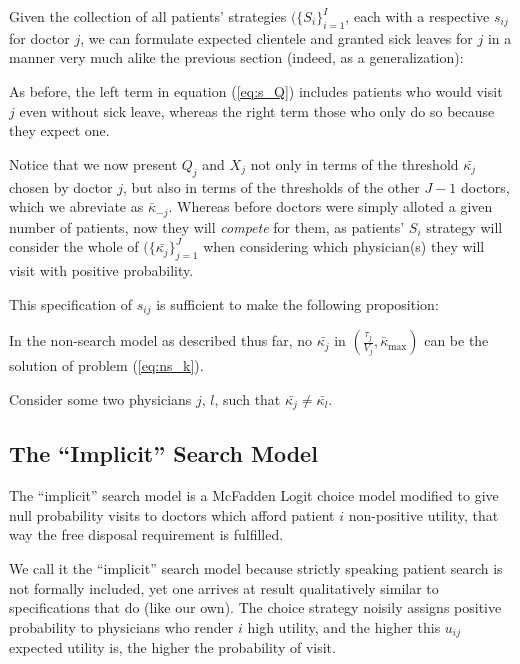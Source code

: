 \documentclass[../main.tex]{subfiles}
\begin{document}
Given the collection of all patients' strategies $(\{S_i\}_{i =1}^{I}$, each with a respective $s_{ij}$ for doctor $j$, we can formulate expected clientele and granted sick leaves for $j$ in a manner very much alike the previous section (indeed, as a generalization):


As before, the left term in equation (\ref{eq:s_Q}) includes patients who would visit $j$ even without sick leave, whereas the right term those who only do so because they expect one.

Notice that we now present $Q_j$ and $X_j$  not only in terms of the threshold $\bar{\kappa_j}$ chosen by doctor $j$, but also in terms of the thresholds of the other $J - 1$ doctors, which we abreviate as $\bar{\kappa}_{-j}$. Whereas before doctors were simply alloted a given number of patients, now they will \textit{compete} for them, as patients' $S_i$ strategy will consider the whole of $(\{\bar{\kappa_j}\}_{j =1}^{J}$ when considering which physician(s) they will visit with positive probability.



This specification of $s_{ij}$ is sufficient to make the following proposition:

\begin{prop}
    \label{complements}
In the non-search model as described thus far, no $\bar{\kappa_j}$ in $(\frac{\tau_j}{V_j}, \bar{\kappa}_{\max})$ can be the solution of problem (\ref{eq:ns_k}).
\end{prop}

Consider some two physicians $j$, $l$, such that $\bar{\kappa_j} \neq \bar{\kappa_l}$.







\subsection{The ``Implicit'' Search Model}

The ``implicit'' search model is a McFadden Logit choice model modified to give null probability visits to doctors which afford patient $i$ non-positive utility, that way the free disposal requirement is fulfilled.

We call it the ``implicit'' search model because strictly speaking patient search is not formally included, yet one arrives at result qualitatively similar to specifications that do (like our own). The choice strategy noisily assigns positive probability to physicians who render $i$ high utility, and the higher this $u_{ij}$ expected utility is, the higher the probability of visit.
\end{document}
